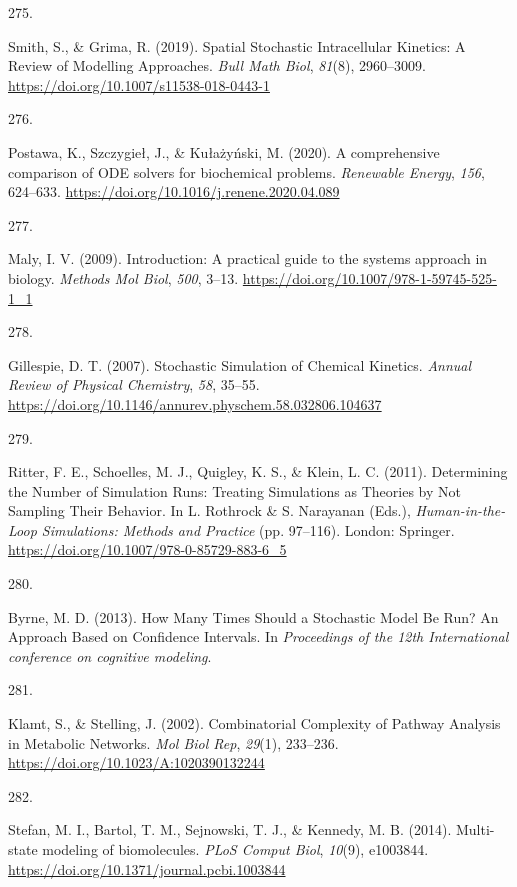 \documentclass[
  11pt,
  letterpaper,
]{scrreprt}
\newlength{\cslhangindent}
\newlength{\csllabelwidth}
\newenvironment{CSLReferences}[2] %
 {\begin{list}{}{%
  \setlength{\itemindent}{0pt}
  \setlength{\leftmargin}{0pt}
  \setlength{\parsep}{0pt}
  \ifodd #1
   \setlength{\leftmargin}{\cslhangindent}
   \setlength{\itemindent}{-1\cslhangindent}
  \fi
  \setlength{\itemsep}{#2\baselineskip}}}
 {\end{list}}
\newcommand{\CSLLeftMargin}[1]{\parbox[t]{\csllabelwidth}{\strut#1\strut}}
\newcommand{\CSLRightInline}[1]{\parbox[t]{\linewidth - \csllabelwidth}{\strut#1\strut}}
\begin{document}
\begin{CSLReferences}{0}{0}
\CSLLeftMargin{275. }%
\CSLRightInline{Smith, S., \& Grima, R. (2019). Spatial {Stochastic
Intracellular Kinetics}: {A Review} of {Modelling Approaches}.
\emph{Bull Math Biol}, \emph{81}(8), 2960--3009.
\url{https://doi.org/10.1007/s11538-018-0443-1}}

\CSLLeftMargin{276. }%
\CSLRightInline{Postawa, K., Szczygieł, J., \& Kułażyński, M. (2020). A
comprehensive comparison of {ODE} solvers for biochemical problems.
\emph{Renewable Energy}, \emph{156}, 624--633.
\url{https://doi.org/10.1016/j.renene.2020.04.089}}

\CSLLeftMargin{277. }%
\CSLRightInline{Maly, I. V. (2009). Introduction: A practical guide to
the systems approach in biology. \emph{Methods Mol Biol}, \emph{500},
3--13. \url{https://doi.org/10.1007/978-1-59745-525-1_1}}

\CSLLeftMargin{278. }%
\CSLRightInline{Gillespie, D. T. (2007). Stochastic {Simulation} of
{Chemical Kinetics}. \emph{Annual Review of Physical Chemistry},
\emph{58}, 35--55.
\url{https://doi.org/10.1146/annurev.physchem.58.032806.104637}}

\CSLLeftMargin{279. }%
\CSLRightInline{Ritter, F. E., Schoelles, M. J., Quigley, K. S., \&
Klein, L. C. (2011). Determining the {Number} of {Simulation Runs}:
{Treating Simulations} as {Theories} by {Not Sampling Their Behavior}.
In L. Rothrock \& S. Narayanan (Eds.), \emph{Human-in-the-{Loop
Simulations}: {Methods} and {Practice}} (pp. 97--116). London: Springer.
\url{https://doi.org/10.1007/978-0-85729-883-6_5}}

\CSLLeftMargin{280. }%
\CSLRightInline{Byrne, M. D. (2013). How {Many Times Should} a
{Stochastic Model Be Run}? {An Approach Based} on {Confidence
Intervals}. In \emph{Proceedings of the 12th {International} conference
on cognitive modeling}.}

\CSLLeftMargin{281. }%
\CSLRightInline{Klamt, S., \& Stelling, J. (2002). Combinatorial
{Complexity} of {Pathway Analysis} in {Metabolic Networks}. \emph{Mol
Biol Rep}, \emph{29}(1), 233--236.
\url{https://doi.org/10.1023/A:1020390132244}}

\CSLLeftMargin{282. }%
\CSLRightInline{Stefan, M. I., Bartol, T. M., Sejnowski, T. J., \&
Kennedy, M. B. (2014). Multi-state modeling of biomolecules. \emph{PLoS
Comput Biol}, \emph{10}(9), e1003844.
\url{https://doi.org/10.1371/journal.pcbi.1003844}}


\end{CSLReferences}
\end{document}
